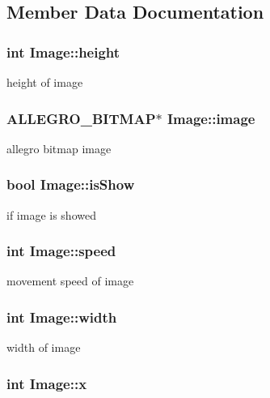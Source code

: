 \subsection{Member Data Documentation}
\hypertarget{struct_image_a51df43db420c9c0b57536cb2dd36de5c}{
\subsubsection[{height}]{\setlength{\rightskip}{0pt plus 5cm}int Image\-::height}}\label{struct_image_a51df43db420c9c0b57536cb2dd36de5c}
height of image \hypertarget{struct_image_a48911c76fc670b89a89b3a3d4dc5bd0e}{
\subsubsection[{image}]{\setlength{\rightskip}{0pt plus 5cm}A\-L\-L\-E\-G\-R\-O\-\_\-\-B\-I\-T\-M\-A\-P$\ast$ Image\-::image}}\label{struct_image_a48911c76fc670b89a89b3a3d4dc5bd0e}
allegro bitmap image \hypertarget{struct_image_a8914532f5c09f3cb38df19e5bea265fd}{
\subsubsection[{is\-Show}]{\setlength{\rightskip}{0pt plus 5cm}bool Image\-::is\-Show}}\label{struct_image_a8914532f5c09f3cb38df19e5bea265fd}
if image is showed \hypertarget{struct_image_aa77f97d93c43c67e11a68028aafa062b}{
\subsubsection[{speed}]{\setlength{\rightskip}{0pt plus 5cm}int Image\-::speed}}\label{struct_image_aa77f97d93c43c67e11a68028aafa062b}
movement speed of image \hypertarget{struct_image_ab8d12f635013c04159cd4d3d972bac88}{
\subsubsection[{width}]{\setlength{\rightskip}{0pt plus 5cm}int Image\-::width}}\label{struct_image_ab8d12f635013c04159cd4d3d972bac88}
width of image \hypertarget{struct_image_a7f8f4530212c93856e611030e46c82af}{
\subsubsection[{x}]{\setlength{\rightskip}{0pt plus 5cm}int Image\-::x}}\label{struct_image_a7f8f4530212c93856e611030e46c82af}
